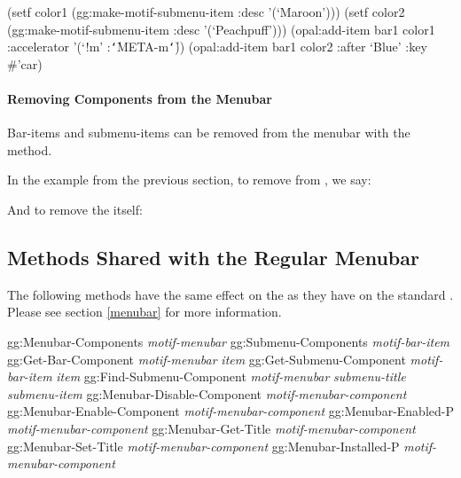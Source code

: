 \begin{programexample}
(setf color1 (gg:make-motif-submenu-item :desc '(`Maroon')))
(setf color2 (gg:make-motif-submenu-item :desc '(`Peachpuff')))
(opal:add-item bar1 color1 :accelerator '(`!m' :{\tt\char`\|}META-m{\tt\char`\|}))
(opal:add-item bar1 color2 :after `Blue' :key \#'car)
\end{programexample}


\paragraph{Removing Components from the Menubar}

Bar-items and submenu-items can be removed from the menubar with the
 method.

In the example from the previous section, to remove  from ,
we say:


And to remove the  itself:



\begin{group}
\subsection{Methods Shared with the Regular Menubar}

The following methods have the same effect on the  as
they have on the standard .  Please see section \ref{menubar}
for more information.

\begin{programexample}
gg:Menubar-Components {\it motif-menubar} \value{method}
gg:Submenu-Components {\it motif-bar-item} \value{method}
gg:Get-Bar-Component {\it motif-menubar} {\it item} \value{method}
gg:Get-Submenu-Component {\it motif-bar-item} {\it item} \value{method}
gg:Find-Submenu-Component {\it motif-menubar} {\it submenu-title} {\it submenu-item} \value{method}
gg:Menubar-Disable-Component {\it motif-menubar-component} \value{method}
gg:Menubar-Enable-Component {\it motif-menubar-component} \value{method}
gg:Menubar-Enabled-P {\it motif-menubar-component} \value{method}
gg:Menubar-Get-Title {\it motif-menubar-component} \value{method}
gg:Menubar-Set-Title {\it motif-menubar-component} \value{method}
gg:Menubar-Installed-P {\it motif-menubar-component} \value{method}
\end{programexample}
\end{group}



